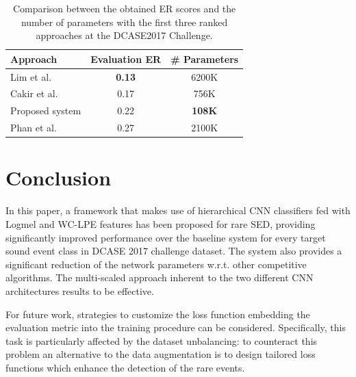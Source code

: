 \begin{table}[t]
	\centering
	\footnotesize
	\caption{Comparison between the obtained ER scores and the number of parameters with the first three ranked approaches at the DCASE2017 Challenge.}
	\label{tab:params}
	\begin{tabular}{|l|c|c|}
		\hline
		Approach        & Evaluation ER & \# Parameters \\ \hline
		Lim et al. \cite{limrare}      & \textbf{0.13}                               & 6200K          \\ 
		Cakir et al.  \cite{cakirconvolutional}   & 0.17                               & 756K          \\ 
		Proposed system & 0.22                               & \textbf{108K}         \\ 
		Phan et al. \cite{phan2017dnn}   & 0.27                               & 2100K          \\ \hline
	\end{tabular}
\end{table}


\section{Conclusion}
In this paper, a framework that makes use of hierarchical CNN classifiers fed with Logmel and WC-LPE features has been proposed for rare SED, providing significantly improved performance over the baseline system for every target sound event class in DCASE 2017 challenge dataset. The system also provides a significant reduction of the network parameters w.r.t. other competitive algorithms.  
The multi-scaled approach inherent to the two different CNN architectures results to be effective. 

For future work, strategies to customize the loss function embedding the evaluation metric into the training procedure can be considered. Specifically, this task is particularly affected by the dataset unbalancing: to counteract this problem an alternative to the data augmentation is to design tailored loss functions which enhance the detection of the rare events. 


